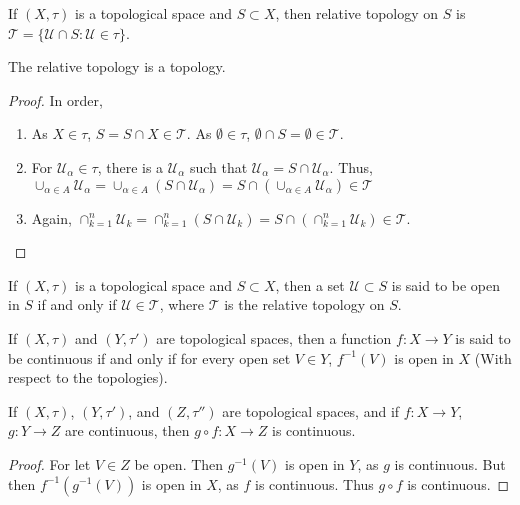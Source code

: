 \documentclass[crop=false,class=article,oneside]{standalone}
\begin{document}
            \begin{definition}
            If $(X,\tau)$ is a topological space and $S\subset X$, then relative topology on $S$ is $\mathscr{T}=\{\mathcal{U}\cap S:\mathcal{U}\in \tau\}$.
            \end{definition}
            \begin{theorem}
            The relative topology is a topology.
            \end{theorem}
            \begin{proof}
            In order,
            \begin{enumerate}
            \item As $X\in \tau$, $S=S\cap X \in \mathscr{T}$. As $\emptyset\in \tau$, $\emptyset\cap S = \emptyset \in \mathscr{T}$. 
            \item For $\mathscr{U}_\alpha\in \mathscr{\tau}$, there is a $\mathcal{U}_\alpha$ such that $\mathscr{U}_\alpha = S\cap \mathcal{U}_\alpha$. Thus, $\cup_{\alpha \in A} \mathscr{U}_\alpha = \cup_{\alpha \in A}(S\cap \mathcal{U}_\alpha) = S\cap (\cup_{\alpha \in A}\mathscr{U}_\alpha)\in \mathscr{T}$
            \item Again, $\cap_{k=1}^{n} \mathscr{U}_k = \cap_{k=1}^{n}(S\cap \mathcal{U}_k) = S\cap (\cap_{k=1}^{n} \mathcal{U}_k)\in \mathscr{T}$.
            \end{enumerate}
            \end{proof}
            \begin{definition}
            If $(X,\tau)$ is a topological space and $S\subset X$, then a set $\mathcal{U}\subset S$ is said to be open in $S$ if and only if $\mathcal{U}\in \mathscr{T}$, where $\mathscr{T}$ is the relative topology on $S$.
            \end{definition}
            \begin{definition}
            If $(X,\tau)$ and $(Y,\tau')$ are topological spaces, then a function $f:X\rightarrow Y$ is said to be continuous if and only if for every open set $V\in Y$, $f^{-1}(V)$ is open in $X$ (With respect to the topologies).
            \end{definition}
            \begin{theorem}
            If $(X,\tau)$, $(Y,\tau')$, and $(Z,\tau'')$ are topological spaces, and if $f:X\rightarrow Y$, $g:Y\rightarrow Z$ are continuous, then $g\circ f:X\rightarrow Z$ is continuous.
            \end{theorem}
            \begin{proof}
            For let $V\in Z$ be open. Then $g^{-1}(V)$ is open in $Y$, as $g$ is continuous. But then $f^{-1}(g^{-1}(V))$ is open in $X$, as $f$ is continuous. Thus $g\circ f$ is continuous.
            \end{proof}
\end{document}
